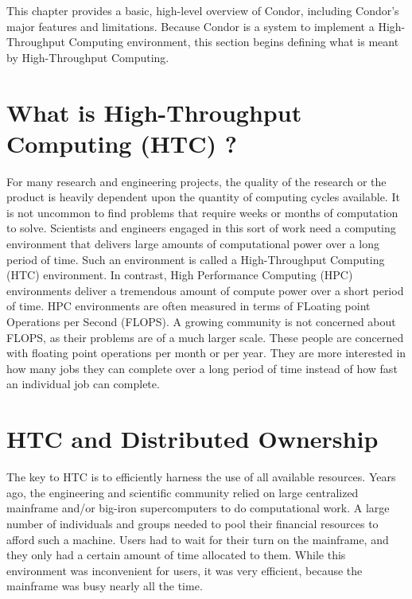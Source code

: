 
This chapter provides a basic, high-level overview of Condor, including
Condor's major features and limitations. Because Condor is a system to
implement a High-Throughput Computing environment, this section begins
defining what is meant by High-Throughput Computing.


\section{What is High-Throughput Computing (HTC) ?}

For many research and engineering projects, the quality of the research
or the product is heavily dependent upon the quantity of computing
cycles available. It is not uncommon to find problems that require weeks
or months of computation to solve. Scientists and engineers engaged in
this sort of work need a computing environment that delivers large
amounts of computational power over a long period of time. Such an
environment is called a High-Throughput Computing (HTC) environment.
In contrast, High Performance Computing (HPC)
environments deliver a
tremendous amount of compute power over a short period of time. HPC
environments are often measured in terms of FLoating point Operations
per Second (FLOPS). 
A growing community is not concerned about FLOPS,
as their problems are of a much larger scale.
These people are
concerned with floating point operations per month or per year.
They are
more interested in how many jobs they can complete over a long period of
time instead of how fast an individual job can complete.

\section{HTC and Distributed Ownership}

The key to HTC is to efficiently harness the use of all available
resources. Years ago, the engineering and scientific community relied on
large centralized mainframe and/or big-iron supercomputers to do
computational work. A large number of individuals and groups needed
to pool their financial resources to afford such a machine. Users had
to wait for their turn on the mainframe, 
and they only had a certain amount of time allocated to them.
While this environment was
inconvenient for users, it was very efficient, because the mainframe
was busy nearly all the time.

